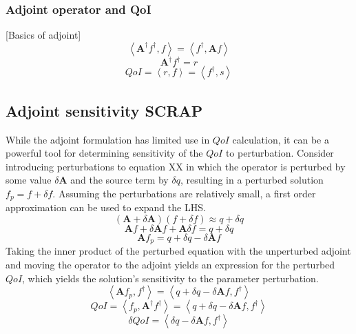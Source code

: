 \documentclass{article}
\newcommand{\bra}{\left\langle}
\newcommand{\ket}{\right\rangle}
\newcommand{\qoi}{QoI}
\begin{document}
\subsubsection{Adjoint operator and QoI}
[Basics of adjoint]
\begin{equation}
\bra \mathbf{A^\dag} f^\dag, f \ket = \bra f^\dag, \mathbf{A} f \ket 
\end{equation}
\begin{equation}
\mathbf{A^\dag} f^\dag = r
\end{equation}
\begin{equation}
\qoi = \bra r , f \ket = \bra f^\dag, s \ket 
\end{equation}

\subsection{Adjoint sensitivity SCRAP}
While the adjoint formulation has limited use in $\qoi$ calculation, it can be a powerful tool for determining sensitivity of the $\qoi$ to perturbation. Consider introducing perturbations to equation {\color{red}XX} in which the operator is perturbed by some value $\delta \mathbf{A}$ and the source term by $\delta q$, resulting in a perturbed solution $f_p=f+\delta f$. Assuming the perturbations are relatively small, a first order approximation can be used to expand the LHS.
\begin{equation}
\left( \mathbf{A} + \delta \mathbf{A} \right) \left( f + \delta f \right) \approx q + \delta q 
\end{equation}
\begin{equation}
\mathbf{A} f  + \delta \mathbf{A} f + \mathbf{A}\delta f  = q + \delta q 
\end{equation}
\begin{equation}
\mathbf{A} f_p   = q + \delta q - \delta \mathbf{A} f
\end{equation}
Taking the inner product of the perturbed equation with the unperturbed adjoint and moving the operator to the adjoint yields an expression for the perturbed $\qoi$, which yields the solution's sensitivity to the parameter perturbation.
\begin{equation}
\bra \mathbf{A} f_p , f^\dag \ket  = \bra  q + \delta q - \delta \mathbf{A} f , f^\dag \ket 
\end{equation}
\begin{equation}
\qoi = \bra  f_p , \mathbf{A^\dag} f^\dag \ket  = \bra  q + \delta q - \delta \mathbf{A} f , f^\dag \ket 
\end{equation}
\begin{equation}
\delta \qoi = \bra \delta q - \delta \mathbf{A} f , f^\dag \ket 
\end{equation}
\end{document}
